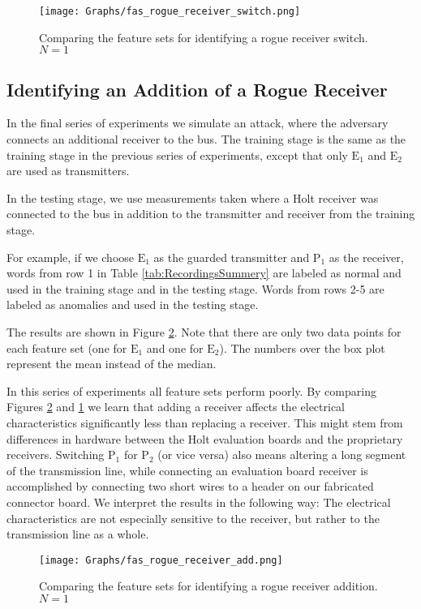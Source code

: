 \documentclass[compsoc,conference,a4paper,10pt,times]{IEEEtran}
\newcommand{\sublevel}[1]{\subsection{#1}}
\newcommand{\sublevel}[1]{\section{#1}}
\begin{document}
  \begin{figure}[t]
    \centering
    \texttt{[image: Graphs/fas\_rogue\_receiver\_switch.png]}
    \caption{Comparing the feature sets for identifying a rogue receiver switch. \(N = 1\)}
    \label{fig:receiver_results}
  \end{figure}
  
\sublevel{Identifying an Addition of a Rogue Receiver}
  In the final series of experiments we simulate an attack, where the adversary connects an additional receiver to the bus. The training stage is the same as the training stage in the previous series of experiments, except that only \(\text{E}_1\) and \(\text{E}_2\) are used as transmitters.
  
  In the testing stage, we use measurements taken where a Holt receiver was connected to the bus in addition to the transmitter and receiver from the training stage.
  
  For example, if we choose \(\text{E}_1\) as the guarded transmitter and \(\text{P}_1\) as the receiver, words from row 1 in Table \ref{tab:RecordingsSummery} are labeled as normal and used in the training stage and in the testing stage. Words from rows 2-5 are labeled as anomalies and used in the testing stage.
  
  The results are shown in Figure \ref{fig:load_results}. Note that there are only two data points for each feature set (one for \(\text{E}_1\) and one for \(\text{E}_2\)). The numbers over the box plot represent the mean instead of the median.
  
  In this series of experiments all feature sets perform poorly. By comparing Figures \ref{fig:load_results} and \ref{fig:receiver_results} we learn that adding a receiver affects the electrical characteristics significantly less than replacing a receiver. This might stem from differences in hardware between the Holt evaluation boards and the proprietary receivers. Switching \(\text{P}_1\) for \(\text{P}_2\) (or vice versa) also means altering a long segment of the transmission line, while connecting an evaluation board receiver is accomplished by connecting two short wires to a header on our fabricated connector board. We interpret the results in the following way: The electrical characteristics are not especially sensitive to the receiver, but rather to the transmission line as a whole.
  
  \begin{figure}[t]
    \centering
    \texttt{[image: Graphs/fas\_rogue\_receiver\_add.png]}
    \caption{Comparing the feature sets for identifying a rogue receiver addition. \(N = 1\)}
    \label{fig:load_results}
  \end{figure}
\end{document}
